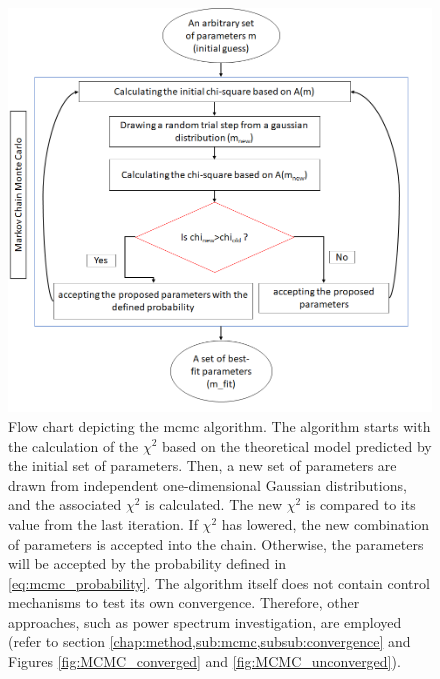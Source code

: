 \documentclass[12pt, TexShade, letterpaper]{report}
\begin{document}
\begin{figure}[h!]
\centering
\includegraphics[scale =0.9]{MCMC_flow.png}
\caption[Flow chart of \gls{mcmc}]{Flow chart depicting the \gls{mcmc} algorithm. The algorithm starts with the calculation of the $\chi^2$ based on the theoretical model predicted by the initial set of parameters. Then, a new set of parameters are drawn from independent one-dimensional Gaussian distributions, and the associated $\chi^2$ is calculated. The new $\chi^2$ is compared to its value from the last iteration. If $\chi^2$ has lowered, the new combination of parameters is accepted into the chain. Otherwise, the parameters will be accepted by the probability defined in \ref{eq:mcmc_probability}. The algorithm itself does not contain control mechanisms to test its own convergence. Therefore, other approaches, such as power spectrum investigation, are employed (refer to section \ref{chap:method,sub:mcmc,subsub:convergence} and Figures \ref{fig:MCMC_converged} and \ref{fig:MCMC_unconverged}).}
\label{fig:MCMC_flow}
\end{figure}
\end{document}
